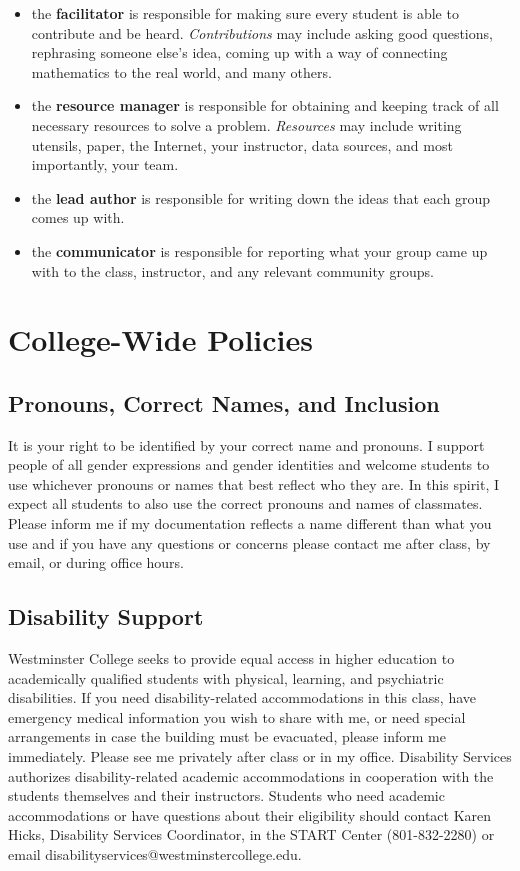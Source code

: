 \documentclass[11pt, a4paper]{article}
\begin{document}
\begin{itemize}
\item the \textbf{facilitator} is responsible for making sure every student is able to contribute and be heard. \textit{Contributions} may include asking good questions, rephrasing someone else's idea, coming up with a way of connecting mathematics to the real world, and many others.
\item the \textbf{resource manager} is responsible for obtaining and keeping track of all necessary resources to solve a problem. \textit{Resources} may include writing utensils, paper, the Internet, your instructor, data sources, and most importantly, your team. 
\item the \textbf{lead author} is responsible for writing down the ideas that each group comes up with.
\item the \textbf{communicator} is responsible for reporting what your group came up with to the class, instructor, and any relevant community groups.
\end{itemize}

\section*{College-Wide Policies}

\subsection*{Pronouns, Correct Names, and Inclusion} It is your right to be identified by your correct name and pronouns. I support people of all gender expressions and gender identities and welcome students to use whichever pronouns or names that best reflect who they are. In this spirit, I expect all students to also use the correct pronouns and names of classmates. Please inform me if my documentation reflects a name different than what you use and if you have any questions or concerns please contact me after class, by email, or during office hours.

\subsection*{Disability Support} Westminster College seeks to provide equal access in higher education to academically qualified students with physical, learning, and psychiatric disabilities. If you need disability-related accommodations in this class, have emergency medical information you wish to share with me, or need special arrangements in case the building must be evacuated, please inform me immediately. Please see me privately after class or in my office. Disability Services authorizes disability-related academic accommodations in cooperation with the students themselves and their instructors. Students who need academic accommodations or have questions about their eligibility should contact Karen Hicks, Disability Services Coordinator, in the START Center (801-832-2280) or email disabilityservices@westminstercollege.edu.
\end{document}
